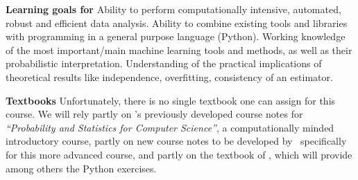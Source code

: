 \item[]{\bf Learning goals for \statcl} Ability to perform computationally intensive, automated, robust and efficient data analysis. Ability to combine existing tools and libraries with programming in a general purpose language (Python). 
Working knowledge of the most important/main machine learning tools and methods, as well as their probabilistic interpretation. Understanding of the practical implications of theoretical results like independence, overfitting, consistency of an estimator. 

{\bf Textbooks} Unfortunately, there is no single textbook one can
assign for this course. We will rely partly on \meila's previously
developed course notes for {\it ``Probability and Statistics for
  Computer Science''}, a computationally minded introductory course,
partly on new course notes to be developed by \meila\ specifically for
this more advanced course, and partly on the textbook of \astrocl,
which will provide among others the Python exercises. %

